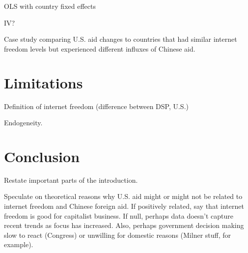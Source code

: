 \documentclass{article}
\begin{document}
OLS with country fixed effects

IV?

Case study comparing U.S. aid changes to countries that had similar internet freedom levels but experienced different influxes of Chinese aid.

\section*{Limitations}
Definition of internet freedom (difference between DSP, U.S.)

Endogeneity.

\section*{Conclusion}
Restate important parts of the introduction.

Speculate on theoretical reasons why U.S. aid might or might not be related to internet freedom and Chinese foreign aid. If positively related, say that internet freedom is good for capitalist business. If null, perhaps data doesn't capture recent trends as focus has increased. Also, perhaps government decision making slow to react (Congress) or unwilling for domestic reasons (Milner stuff, for example).

\nocite{mechkova2022a}
\nocite{pemstein2022}
\nocite{coppedge2022}
\nocite{coppedge2022a}
\nocite{coppedge2022b}
\nocite{coppedge2022c}
\nocite{coppedge2022d}
\pagebreak
\printbibliography
\end{document}
